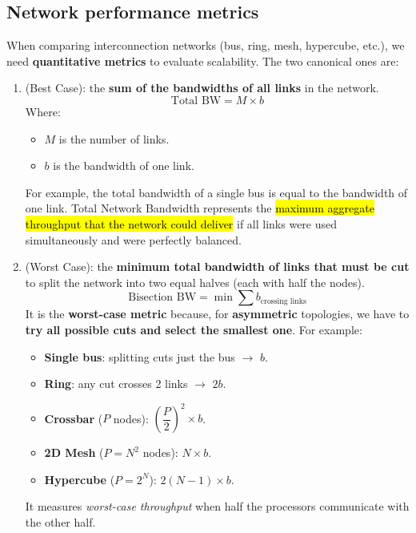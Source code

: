 \subsection{Network performance metrics}

When comparing interconnection networks (bus, ring, mesh, hypercube, etc.), we need \textbf{quantitative metrics} to evaluate scalability. The two canonical ones are:
\begin{enumerate}
    \item {} (Best Case): the \textbf{sum of the bandwidths of all links} in the network.
    \begin{equation}
        \text{Total BW} = M \times b
    \end{equation}
    Where:
    \begin{itemize}
        \item $M$ is the number of links.
        \item $b$ is the bandwidth of one link.
    \end{itemize}
    For example, the total bandwidth of a single bus is equal to the bandwidth of one link. Total Network Bandwidth represents the \hl{maximum aggregate throughput that the network could deliver} if all links were used simultaneously and were perfectly balanced.
    
    \item {} (Worst Case): the \textbf{minimum total bandwidth of links that must be cut} to split the network into two equal halves (each with half the nodes).
    \begin{equation}
        \text{Bisection BW} = \min \displaystyle\sum b_{\text{crossing links}}
    \end{equation}
    It is the \textbf{worst-case metric} because, for \textbf{asymmetric} topologies, we have to \textbf{try all possible cuts and select the smallest one}. For example:
    \begin{itemize}
        \item \textbf{Single bus}: splitting cuts just the bus $\rightarrow$ $b$.
        \item \textbf{Ring}: any cut crosses 2 links $\rightarrow$ $2b$.
        \item \textbf{Crossbar} ($P$ nodes): $\left(\dfrac{P}{2}\right)^2 \times b$.
        \item \textbf{2D Mesh} ($P = N^{2}$ nodes): $N \times b$.
        \item \textbf{Hypercube} ($P = 2^{N}$): $2\left(N-1\right) \times b$.
    \end{itemize}
    It measures \emph{worst-case throughput} when half the processors communicate with the other half.
\end{enumerate}

